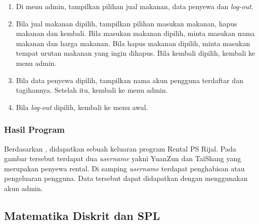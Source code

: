 \documentclass[../main.tex]{subfiles}
\begin{document}
\begin{enumerate}
\begin{enumerate}
            \item{Di menu admin, tampilkan pilihan jual makanan, data penyewa dan \textit{log-out}.}
            \item{Bila jual makanan dipilih, tampilkan pilihan masukan makanan, hapus makanan dan kembali. Bila masukan makanan dipilih, minta masukan nama makanan dan harga makanan. Bila hapus makanan dipilih, minta masukan tempat urutan makanan yang ingin dihapus. Bila kembali dipilih, kembali ke menu admin.}
            \item{Bila data penyewa dipilih, tampilkan nama akun pengguna terdaftar dan tagihannya. Setelah itu, kembali ke menu admin.}
            \item{Bila \textit{log-out} dipilih, kembali ke menu awal.}
        \end{enumerate}
    \end{enumerate}
    \newpage
    \subsubsectionf{\Flowchart}
    \vspace{0.5ex}

    \subsubsection{{\Source} {\sCode}}

    \subsubsection{Hasil Program}

    \begin{indentpar}
        \hspace{\parindent}Berdasarkan , didapatkan sebuah keluaran program Rental PS Rijal. Pada gambar tersebut terdapat dua \textit{username} yakni YuanZun dan TaiShang yang merupakan penyewa rental. Di samping \textit{username} terdapat penghabisan atau pengeluaran pengguna. Data tersebut dapat didapatkan dengan menggunakan akun admin.
    \end{indentpar}

    \subsection{Matematika Diskrit dan SPL}
\end{document}
